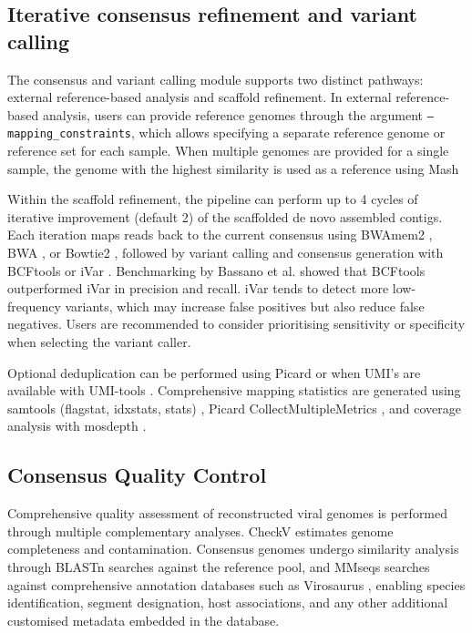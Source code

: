 \subsection{Iterative consensus refinement and variant calling}

The consensus and variant calling module supports two distinct pathways: external reference-based analysis and scaffold refinement. In external reference-based analysis, users can provide reference genomes through the argument \texttt{--mapping\_constraints}, which allows specifying a separate reference genome or reference set for each sample. When multiple genomes are provided for a single sample, the genome with the highest similarity is used as a reference using Mash \cite{Ondov2019-bo}

Within the scaffold refinement, the pipeline can perform up to 4 cycles of iterative improvement (default 2) of the scaffolded de novo assembled contigs. Each iteration maps reads back to the current consensus using BWAmem2 \cite{Vasimuddin2019-rb}, BWA \cite{Li2013-pp}, or Bowtie2 \cite{Langmead2019-wx}, followed by variant calling and consensus generation with BCFtools \cite{Danecek2021-je} or iVar \cite{Grubaugh2019-xd}. Benchmarking by Bassano et al. \cite{Bassano2022-cl} showed that BCFtools outperformed iVar in precision and recall. iVar tends to detect more low-frequency variants, which may increase false positives but also reduce false negatives. Users are recommended to consider prioritising sensitivity or specificity when selecting the variant caller.

Optional deduplication can be performed using Picard or when UMI’s are available with UMI-tools \cite{Smith2017-nk}. Comprehensive mapping statistics are generated using samtools (flagstat, idxstats, stats) \cite{Danecek2021-je}, Picard CollectMultipleMetrics \cite{Broad-Institute2019-rv}, and coverage analysis with mosdepth \cite{Pedersen2018-mu}.

\subsection{Consensus Quality Control}

Comprehensive quality assessment of reconstructed viral genomes is performed through multiple complementary analyses. CheckV \cite{Nayfach2021-wl} estimates genome completeness and contamination. Consensus genomes undergo similarity analysis through BLASTn \cite{Altschul1990-sy} searches against the reference pool, and MMseqs \cite{Steinegger2017-ci} searches against comprehensive annotation databases such as Virosaurus \cite{Gleizes2020-rq}, enabling species identification, segment designation, host associations, and any other additional customised metadata embedded in the database.

